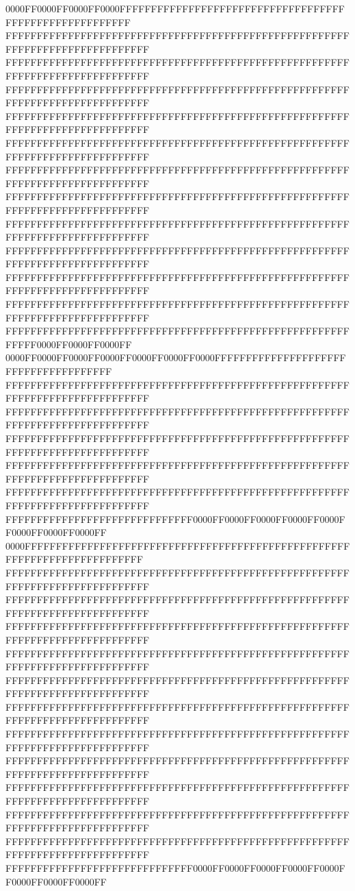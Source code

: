 0000FF0000FF0000FF0000FFFFFFFFFFFFFFFFFFFFFFFFFFFFFFFFFFFFFFFFFFFFFFFFFFFFFFFF
FFFFFFFFFFFFFFFFFFFFFFFFFFFFFFFFFFFFFFFFFFFFFFFFFFFFFFFFFFFFFFFFFFFFFFFFFFFFFF
FFFFFFFFFFFFFFFFFFFFFFFFFFFFFFFFFFFFFFFFFFFFFFFFFFFFFFFFFFFFFFFFFFFFFFFFFFFFFF
FFFFFFFFFFFFFFFFFFFFFFFFFFFFFFFFFFFFFFFFFFFFFFFFFFFFFFFFFFFFFFFFFFFFFFFFFFFFFF
FFFFFFFFFFFFFFFFFFFFFFFFFFFFFFFFFFFFFFFFFFFFFFFFFFFFFFFFFFFFFFFFFFFFFFFFFFFFFF
FFFFFFFFFFFFFFFFFFFFFFFFFFFFFFFFFFFFFFFFFFFFFFFFFFFFFFFFFFFFFFFFFFFFFFFFFFFFFF
FFFFFFFFFFFFFFFFFFFFFFFFFFFFFFFFFFFFFFFFFFFFFFFFFFFFFFFFFFFFFFFFFFFFFFFFFFFFFF
FFFFFFFFFFFFFFFFFFFFFFFFFFFFFFFFFFFFFFFFFFFFFFFFFFFFFFFFFFFFFFFFFFFFFFFFFFFFFF
FFFFFFFFFFFFFFFFFFFFFFFFFFFFFFFFFFFFFFFFFFFFFFFFFFFFFFFFFFFFFFFFFFFFFFFFFFFFFF
FFFFFFFFFFFFFFFFFFFFFFFFFFFFFFFFFFFFFFFFFFFFFFFFFFFFFFFFFFFFFFFFFFFFFFFFFFFFFF
FFFFFFFFFFFFFFFFFFFFFFFFFFFFFFFFFFFFFFFFFFFFFFFFFFFFFFFFFFFFFFFFFFFFFFFFFFFFFF
FFFFFFFFFFFFFFFFFFFFFFFFFFFFFFFFFFFFFFFFFFFFFFFFFFFFFFFFFFFFFFFFFFFFFFFFFFFFFF
FFFFFFFFFFFFFFFFFFFFFFFFFFFFFFFFFFFFFFFFFFFFFFFFFFFFFFFFFFFF0000FF0000FF0000FF
0000FF0000FF0000FF0000FF0000FF0000FF0000FFFFFFFFFFFFFFFFFFFFFFFFFFFFFFFFFFFFFF
FFFFFFFFFFFFFFFFFFFFFFFFFFFFFFFFFFFFFFFFFFFFFFFFFFFFFFFFFFFFFFFFFFFFFFFFFFFFFF
FFFFFFFFFFFFFFFFFFFFFFFFFFFFFFFFFFFFFFFFFFFFFFFFFFFFFFFFFFFFFFFFFFFFFFFFFFFFFF
FFFFFFFFFFFFFFFFFFFFFFFFFFFFFFFFFFFFFFFFFFFFFFFFFFFFFFFFFFFFFFFFFFFFFFFFFFFFFF
FFFFFFFFFFFFFFFFFFFFFFFFFFFFFFFFFFFFFFFFFFFFFFFFFFFFFFFFFFFFFFFFFFFFFFFFFFFFFF
FFFFFFFFFFFFFFFFFFFFFFFFFFFFFFFFFFFFFFFFFFFFFFFFFFFFFFFFFFFFFFFFFFFFFFFFFFFFFF
FFFFFFFFFFFFFFFFFFFFFFFFFFFFFF0000FF0000FF0000FF0000FF0000FF0000FF0000FF0000FF
0000FFFFFFFFFFFFFFFFFFFFFFFFFFFFFFFFFFFFFFFFFFFFFFFFFFFFFFFFFFFFFFFFFFFFFFFFFF
FFFFFFFFFFFFFFFFFFFFFFFFFFFFFFFFFFFFFFFFFFFFFFFFFFFFFFFFFFFFFFFFFFFFFFFFFFFFFF
FFFFFFFFFFFFFFFFFFFFFFFFFFFFFFFFFFFFFFFFFFFFFFFFFFFFFFFFFFFFFFFFFFFFFFFFFFFFFF
FFFFFFFFFFFFFFFFFFFFFFFFFFFFFFFFFFFFFFFFFFFFFFFFFFFFFFFFFFFFFFFFFFFFFFFFFFFFFF
FFFFFFFFFFFFFFFFFFFFFFFFFFFFFFFFFFFFFFFFFFFFFFFFFFFFFFFFFFFFFFFFFFFFFFFFFFFFFF
FFFFFFFFFFFFFFFFFFFFFFFFFFFFFFFFFFFFFFFFFFFFFFFFFFFFFFFFFFFFFFFFFFFFFFFFFFFFFF
FFFFFFFFFFFFFFFFFFFFFFFFFFFFFFFFFFFFFFFFFFFFFFFFFFFFFFFFFFFFFFFFFFFFFFFFFFFFFF
FFFFFFFFFFFFFFFFFFFFFFFFFFFFFFFFFFFFFFFFFFFFFFFFFFFFFFFFFFFFFFFFFFFFFFFFFFFFFF
FFFFFFFFFFFFFFFFFFFFFFFFFFFFFFFFFFFFFFFFFFFFFFFFFFFFFFFFFFFFFFFFFFFFFFFFFFFFFF
FFFFFFFFFFFFFFFFFFFFFFFFFFFFFFFFFFFFFFFFFFFFFFFFFFFFFFFFFFFFFFFFFFFFFFFFFFFFFF
FFFFFFFFFFFFFFFFFFFFFFFFFFFFFFFFFFFFFFFFFFFFFFFFFFFFFFFFFFFFFFFFFFFFFFFFFFFFFF
FFFFFFFFFFFFFFFFFFFFFFFFFFFFFFFFFFFFFFFFFFFFFFFFFFFFFFFFFFFFFFFFFFFFFFFFFFFFFF
FFFFFFFFFFFFFFFFFFFFFFFFFFFFFF0000FF0000FF0000FF0000FF0000FF0000FF0000FF0000FF
